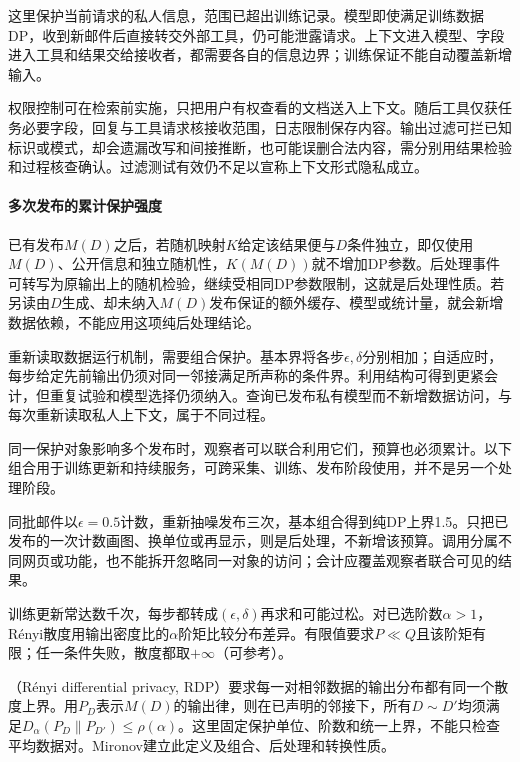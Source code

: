 这里保护当前请求的私人信息，范围已超出训练记录。模型即使满足训练数据DP，收到新邮件后直接转交外部工具，仍可能泄露请求。上下文进入模型、字段进入工具和结果交给接收者，都需要各自的信息边界；训练保证不能自动覆盖新增输入。

权限控制可在检索前实施，只把用户有权查看的文档送入上下文。随后工具仅获任务必要字段，回复与工具请求核接收范围，日志限制保存内容。输出过滤可拦已知标识或模式，却会遗漏改写和间接推断，也可能误删合法内容，需分别用结果检验和过程核查确认。过滤测试有效仍不足以宣称上下文形式隐私成立。

\paragraph{多次发布的累计保护强度}
\label{sec:privacy-repeated-use}

已有发布$M(D)$之后，若随机映射$K$给定该结果便与$D$条件独立，即仅使用$M(D)$、公开信息和独立随机性，$K(M(D))$就不增加DP参数。后处理事件可转写为原输出上的随机检验，继续受相同DP参数限制，这就是后处理性质。若另读由$D$生成、却未纳入$M(D)$发布保证的额外缓存、模型或统计量，就会新增数据依赖，不能应用这项纯后处理结论。

重新读取数据运行机制，需要组合保护。基本界将各步$\epsilon,\delta$分别相加；自适应时，每步给定先前输出仍须对同一邻接满足所声称的条件界。利用结构可得到更紧会计，但重复试验和模型选择仍须纳入。查询已发布私有模型而不新增数据访问，与每次重新读取私人上下文，属于不同过程。

同一保护对象影响多个发布时，观察者可以联合利用它们，预算也必须累计。以下组合用于训练更新和持续服务，可跨采集、训练、发布阶段使用，并不是另一个处理阶段。

同批邮件以$\epsilon=0.5$计数，重新抽噪发布三次，基本组合得到纯DP上界1.5。只把已发布的一次计数画图、换单位或再显示，则是后处理，不新增该预算。调用分属不同网页或功能，也不能拆开忽略同一对象的访问；会计应覆盖观察者联合可见的结果。

训练更新常达数千次，每步都转成$(\epsilon,\delta)$再求和可能过松。对已选阶数$\alpha>1$，Rényi散度用输出密度比的$\alpha$阶矩比较分布差异。有限值要求$P\ll Q$且该阶矩有限；任一条件失败，散度都取$+\infty$（可参考）。

（Rényi differential privacy, RDP）要求每一对相邻数据的输出分布都有同一个散度上界。用$P_D$表示$M(D)$的输出律，则在已声明的邻接下，所有$D\sim D'$均须满足$D_\alpha(P_D\|P_{D'})\leq\rho(\alpha)$。这里固定保护单位、阶数和统一上界，不能只检查平均数据对。Mironov建立此定义及组合、后处理和转换性质。

